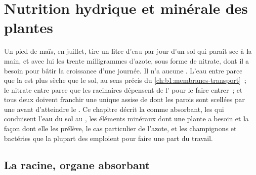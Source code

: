 \chapter{Nutrition hydrique et minérale des plantes}\label{ch:b1:plant-water-minerals}

Un pied de maïs, en juillet, tire un litre d'eau par jour d'un sol qui
paraît sec à la main, et avec lui les trente milligrammes d'azote, sous
forme de nitrate, dont il a besoin pour bâtir la croissance d'une
journée. Il n'a aucune . L'eau entre parce que la  est plus
sèche que le sol, au sens précis du
\cref{ch:b1:membranes-transport}~; le nitrate entre parce que les
 racinaires dépensent de l' pour le faire entrer~; et tous
deux doivent franchir une unique assise de  dont les parois
sont scellées par une  avant d'atteindre le . Ce chapitre
décrit la  comme  absorbant, les  qui
conduisent l'eau du sol au , les éléments minéraux dont une
plante a besoin et la façon dont elle les prélève, le cas particulier
de l'azote, et les champignons et bactéries que la plupart des 
emploient pour faire une part du travail.

\section{La racine, organe absorbant}

